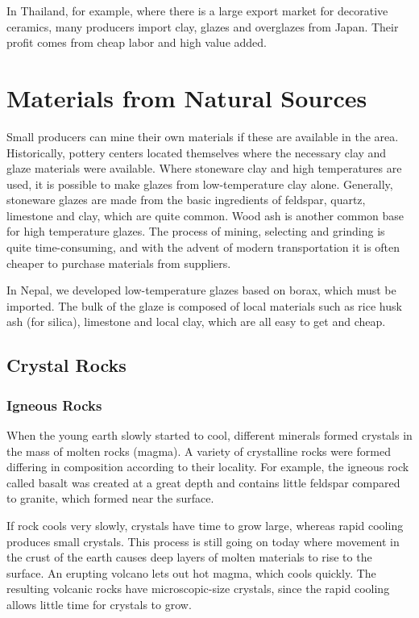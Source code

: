 In Thailand, for example, where there is a large export market for decorative 
ceramics, many producers import clay, glazes and overglazes from Japan. Their 
profit comes from cheap labor and high value added.
\section{Materials from Natural Sources}
Small producers can mine their own materials if these are available in the 
area. Historically, pottery centers located themselves where the necessary clay 
and glaze materials were available. Where stoneware clay and high temperatures 
are used, it is possible to make glazes from low-temperature clay alone. 
Generally, stoneware glazes are made from the basic ingredients of feldspar, 
quartz, limestone and clay, which are quite common. Wood ash is another common 
base for high temperature glazes. The process of mining, selecting and grinding 
is quite time-consuming, and with the advent of modern transportation it is 
often cheaper to purchase materials from suppliers.

In Nepal, we developed low-temperature glazes based on borax, which must be 
imported. The bulk of the glaze is composed of local materials such as rice 
husk ash (for silica), limestone and local clay, which are all easy to get and 
cheap.
\subsection{Crystal Rocks}
\subsubsection{Igneous Rocks}
When the young earth slowly started to cool, different minerals formed crystals 
in the mass of molten rocks (magma). A variety of crystalline rocks were formed 
differing in composition according to their locality. For example, the igneous 
rock called basalt was created at a great depth and contains little feldspar 
compared to granite, which formed near the surface.

If rock cools very slowly, crystals have time to grow large, whereas rapid 
cooling produces small crystals. This process is still going on today where 
movement in the crust of the earth causes deep layers of molten materials to 
rise to the surface. An erupting volcano lets out hot magma, which cools 
quickly. The resulting volcanic rocks have microscopic-size crystals, since the 
rapid cooling allows little time for crystals to grow.

